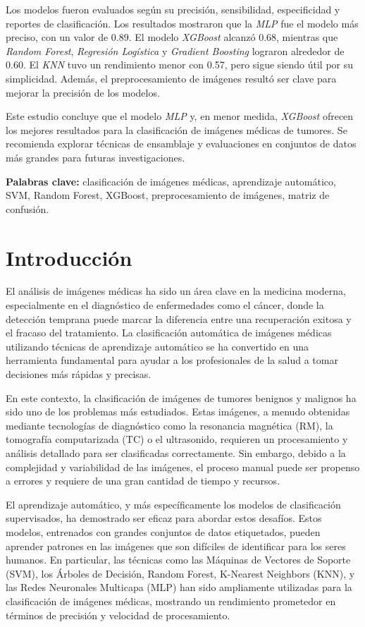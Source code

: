 \documentclass[12pt]{article}
\begin{document}
Los modelos fueron evaluados según su precisión, sensibilidad, especificidad y reportes de clasificación. Los resultados mostraron que la \textit{MLP} fue el modelo más preciso, con un valor de 0.89. El modelo \textit{XGBoost} alcanzó 0.68, mientras que \textit{Random Forest}, \textit{Regresión Logística} y \textit{Gradient Boosting} lograron alrededor de 0.60. El \textit{KNN} tuvo un rendimiento menor con 0.57, pero sigue siendo útil por su simplicidad. Además, el preprocesamiento de imágenes resultó ser clave para mejorar la precisión de los modelos.

Este estudio concluye que el modelo \textit{MLP} y, en menor medida, \textit{XGBoost} ofrecen los mejores resultados para la clasificación de imágenes médicas de tumores. Se recomienda explorar técnicas de ensamblaje y evaluaciones en conjuntos de datos más grandes para futuras investigaciones.

\textbf{Palabras clave:} clasificación de imágenes médicas, aprendizaje automático, SVM, Random Forest, XGBoost, preprocesamiento de imágenes, matriz de confusión.

\section{Introducción}
El análisis de imágenes médicas ha sido un área clave en la medicina moderna, especialmente en el diagnóstico de enfermedades como el cáncer, donde la detección temprana puede marcar la diferencia entre una recuperación exitosa y el fracaso del tratamiento. La clasificación automática de imágenes médicas utilizando técnicas de aprendizaje automático se ha convertido en una herramienta fundamental para ayudar a los profesionales de la salud a tomar decisiones más rápidas y precisas.

En este contexto, la clasificación de imágenes de tumores benignos y malignos ha sido uno de los problemas más estudiados. Estas imágenes, a menudo obtenidas mediante tecnologías de diagnóstico como la resonancia magnética (RM), la tomografía computarizada (TC) o el ultrasonido, requieren un procesamiento y análisis detallado para ser clasificadas correctamente. Sin embargo, debido a la complejidad y variabilidad de las imágenes, el proceso manual puede ser propenso a errores y requiere de una gran cantidad de tiempo y recursos.

El aprendizaje automático, y más específicamente los modelos de clasificación supervisados, ha demostrado ser eficaz para abordar estos desafíos\cite{litjens2017survey}. Estos modelos, entrenados con grandes conjuntos de datos etiquetados, pueden aprender patrones en las imágenes que son difíciles de identificar para los seres humanos. En particular, las técnicas como las Máquinas de Vectores de Soporte (SVM), los Árboles de Decisión, Random Forest, K-Nearest Neighbors (KNN), y las Redes Neuronales Multicapa (MLP) han sido ampliamente utilizadas para la clasificación de imágenes médicas, mostrando un rendimiento prometedor en términos de precisión y velocidad de procesamiento.
\end{document}
